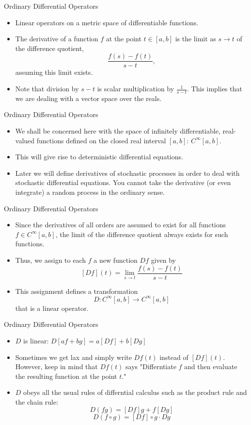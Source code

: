 \begin{frame}
Ordinary Differential Operators
 \begin{itemize}
  \item Linear operators on a metric space of differentiable functions.
  \item The derivative of a function $f$ at the point $t\in [a,b]$ is the limit as $s\rightarrow
 t$ of the difference quotient,
 \[\frac{f(s)-f(t)}{s-t},\]
assuming this limit exists.
\item Note that division by $s-t$ is scalar multiplication by
$ \frac{1}{s-t}$.  This implies that we are dealing with a vector
space over the reals.
\end{itemize}
\end{frame}
\begin{frame}
Ordinary Differential Operators
 \begin{itemize}
\item We shall be concerned here with the space of infinitely differentiable, real-valued functions defined on the closed real interval $[a,b]$:
 $C^\infty[a,b]$.
 \item This will give rise to deterministic differential
 equations.
 \item Later we will define derivatives of stochastic processes in
 order to deal with stochastic differential equations.  You cannot
 take the derivative (or even integrate) a random process in the
 ordinary sense.
\end{itemize}
\end{frame}
\begin{frame}
Ordinary Differential Operators
 \begin{itemize}
 \item Since the derivatives of all orders are assumed to exist
 for all functions $f\in C^\infty[a,b]$, the limit of the
 difference quotient always exists for such functions.
 \item Thus, we assign to each $f$ a new function $Df$ given by
\begin{equation}\label{deriv}
  [Df](t) = \lim_{s\rightarrow t}\frac{f(s)-f(t)}{s-t}
\end{equation}
 \item This assignment defines a transformation
 \[D:C^\infty[a,b]\rightarrow C^\infty[a,b]\]
  that is a linear operator.
\end{itemize}
\end{frame}
\begin{frame}
Ordinary Differential Operators
 \begin{itemize}
    \item $D$ is linear: $D[af+bg]=a[Df] + b[Dg]$
    \item Sometimes we get lax and simply write $Df(t)$ instead of $[Df](t)$.  However, keep in mind that $Df(t)$ says "Differntiate $f$ and then evaluate the resulting function at the point $t$."
    \item $D$ obeys all the usual rules of differntial calculus such as the product rule and the chain rule:
\[D(fg)=[Df]g+f[Dg]\]
\[D(f\circ g) = [Df]\circ g \cdot Dg\]
 \end{itemize}
\end{frame}
